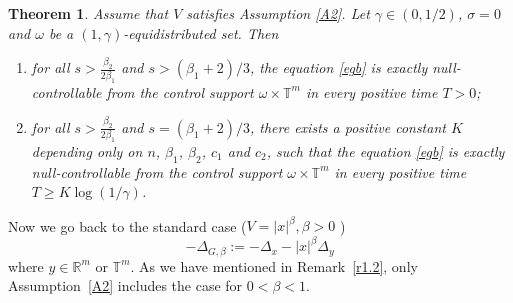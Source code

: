 \documentclass{article}
\numberwithin{equation}{section}
\newcommand\R{\ensuremath{\mathbb{R}}}
\newcommand\T{\ensuremath{\mathbb{T}}}
\newtheorem{theorem}{Theorem}[section]
\numberwithin{equation}{section}
\theoremstyle{definition}
\begin{document}
\begin{theorem}\label{thm1.5g}
	Assume that $V$ satisfies Assumption \ref{A2}. Let $\gamma \in (0,1 /2)$, $\sigma = 0$ and $\omega$ be a $(1,\gamma)$-equidistributed set. Then 
\begin{enumerate}
	\item for all $s> \frac{\beta_2}{2 \beta_1}$ and $s> (\beta_1+2) /{3} $, the equation \eqref{egb} is exactly null-controllable from the control support $\omega\times \T^{m}$ in every positive time $T>0$;
	\item for all $s> \frac{\beta_2}{2\beta_1}$ and $s=(\beta_1+2) /{3} $, there exists a positive constant $K$ depending only on $n$, $\beta_1$, $\beta_2$, $c_1$ and $c_2$, such that the equation \eqref{egb} is exactly null-controllable from the control support $\omega\times \T^{m}$ in every positive time $T\ge K \log(1 /\gamma)$.
\end{enumerate}
\end{theorem}


Now we go back to the standard case ($V=|x|^{\beta},\beta >0$ )
\[
	-\Delta_{G,\beta}:=-\Delta_x-|x|^{\beta}\Delta_y
\] 
where $y \in \R^{m}$ or $\T^{m}$. As we have mentioned in Remark~\ref{r1.2}, only Assumption~\ref{A2} includes the case for $0<\beta <1$.
\end{document}

